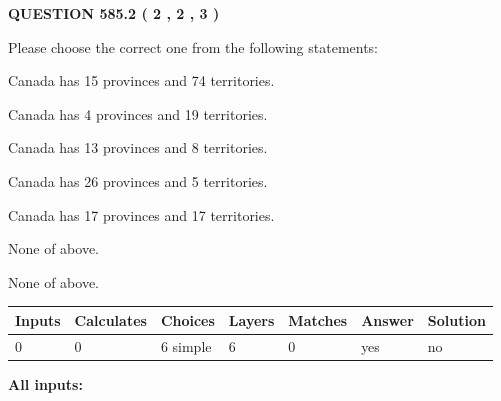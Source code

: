 \documentclass[12pt]{article}
\begin{document}
   
  
\vspace{0.2in}
  
{\textbf{\Large{QUESTION
585.2 
 ( 2 , 2 , 3 )
}}}
  
  
Please choose the correct one from the following statements:
 
 
Canada has  15 provinces and  74 territories.
 
 
Canada has   4 provinces and  19 territories.
 
 
Canada has  13 provinces and  8 territories.
 
 
Canada has  26 provinces and  5 territories.
 
 
Canada has  17 provinces and  17 territories.
 
 
 None of above.
 
 
\noindent{}
 
 
 None of above.
 
 
\noindent{}
 
 
   
   
   
   
\noindent\begin{tabular}{|l|l|l|l|l|l|l|}
 \hline
Inputs & Calculates & Choices & Layers & Matches & Answer & Solution \\ \hline
 0  & 
 0  & 
 6
  simple  
  & 
 6  & 
 0  & 
  yes & 
  no 
  \\ \hline
 \end{tabular}
   
   
   
   
\noindent{}
   
   
   
   
\noindent\vspace{0.1in}\hspace{-0.08in} {\textbf{\Large{All inputs: }}}
   
   
   
   
   
   
 \vspace{0.2in}
 
\end{document}
